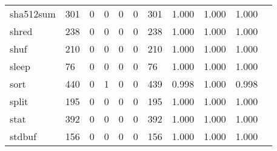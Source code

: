 \begin{longtable}{lp{1.10cm}p{1.10cm}p{1.10cm}p{1.10cm}p{1.10cm}p{1.10cm}p{1.10cm}p{1.10cm}p{1.10cm}p{1.10cm}}
sha512sum &                    301 &                                  0 &                                 0 &                                0 &                                 0 &                             301 &                          1.000 &                                 1.000 &                               1.000 \\
shred     &                    238 &                                  0 &                                 0 &                                0 &                                 0 &                             238 &                          1.000 &                                 1.000 &                               1.000 \\
shuf      &                    210 &                                  0 &                                 0 &                                0 &                                 0 &                             210 &                          1.000 &                                 1.000 &                               1.000 \\
sleep     &                     76 &                                  0 &                                 0 &                                0 &                                 0 &                              76 &                          1.000 &                                 1.000 &                               1.000 \\
sort      &                    440 &                                  0 &                                 1 &                                0 &                                 0 &                             439 &                          0.998 &                                 1.000 &                               0.998 \\
split     &                    195 &                                  0 &                                 0 &                                0 &                                 0 &                             195 &                          1.000 &                                 1.000 &                               1.000 \\
stat      &                    392 &                                  0 &                                 0 &                                0 &                                 0 &                             392 &                          1.000 &                                 1.000 &                               1.000 \\
stdbuf    &                    156 &                                  0 &                                 0 &                                0 &                                 0 &                             156 &                          1.000 &                                 1.000 &                               1.000 \\

\end{longtable}
